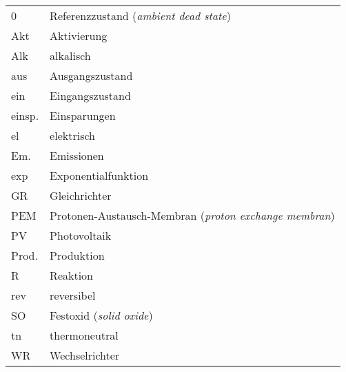\begin{onehalfspacing}
\begin{longtable}[h]{p{} p{}}
		0 		& Referenzzustand (\emph{ambient dead state})\\
		Akt		& Aktivierung\\
		Alk		& alkalisch\\
		aus		& Ausgangszustand\\
		ein		& Eingangszustand\\
		einsp.	& Einsparungen\\
		el		& elektrisch\\
		Em.		& Emissionen\\
		exp		& Exponentialfunktion\\
		GR		& Gleichrichter\\
		PEM		& Protonen-Austausch-Membran (\emph{proton exchange membran})\\
		PV		& Photovoltaik\\
		Prod.	& Produktion\\
		R		& Reaktion\\
		rev		& reversibel\\
		SO		& Festoxid (\emph{solid oxide})\\
		tn		& thermoneutral\\
		WR		& Wechselrichter\\

		
\end{longtable}
\end{onehalfspacing}
